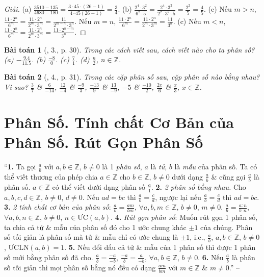 \documentclass{article}
\newtheorem{baitoan}{Bài toán}
\begin{document}
\begin{proof}[Giải]
	(a) $\frac{3510 - 135}{4680 - 180} = \frac{3\cdot45\cdot(26 - 1)}{4\cdot45(26 - 1)} = \frac{3}{4}$. (b) $\frac{2^4\cdot3^2}{6^2\cdot5} = \frac{2^4\cdot3^2}{2^2\cdot3^2\cdot5} = \frac{2^2}{5} = \frac{4}{5}$. (c) Nếu $m > n$, $\frac{11\cdot2^n}{6^m} = \frac{11\cdot2^n}{2^m\cdot3^m} = \frac{11}{2^{m-n}\cdot3^n}$. Nếu $m = n$, $\frac{11\cdot2^n}{6^m} = \frac{11\cdot2^n}{2^m\cdot3^m} = \frac{11}{3^n}$. (c) Nếu $m < n$, $\frac{11\cdot2^n}{6^m} = \frac{11\cdot2^n}{2^m\cdot3^m} = \frac{11\cdot2^{n-m}}{3^n}$.
\end{proof}

\begin{baitoan}[\cite{SBT_Toan_6_Canh_Dieu_tap_2}, 3., p. 30]
	Trong các cách viết sau, cách viết nào cho ta phân số? (a) $-\frac{9.4}{11.5}$. (b) $\frac{-8}{0}$. (c) $\frac{7}{1}$. (d) $\frac{n}{2}$, $n\in\mathbb{Z}$.
\end{baitoan}

\begin{baitoan}[\cite{SBT_Toan_6_Canh_Dieu_tap_2}, 4., p. 31]
	Trong các cặp phân số sau, cặp phân số nào bằng nhau? Vì sao? $\frac{3}{7}$ \& $\frac{6}{-14}$, $\frac{12}{-4}$ \& $\frac{-9}{3}$, $\frac{-13}{9}$ \& $\frac{13}{-9}$, $-5$ \& $\frac{-10}{2}$, $\frac{2x}{6}$ \& $\frac{x}{3}$, $x\in\mathbb{Z}$.
\end{baitoan}


\section{Phân Số. Tính chất Cơ Bản của Phân Số. Rút Gọn Phân Số}
``\textbf{1.} Ta gọi $\frac{a}{b}$ với $a,b\in\mathbb{Z}$, $b\ne0$ là 1 \textit{phân số}, $a$ là \textit{tử}, $b$ là \textit{mẫu} của phân số. Ta có thể viết thương của phép chia $a\in\mathbb{Z}$ cho $b\in\mathbb{Z}$, $b\ne 0$ dưới dạng $\frac{a}{b}$ \& cũng gọi $\frac{a}{b}$ là phân số. $a\in\mathbb{Z}$ có thể viết dưới dạng phân số $\frac{a}{1}$. \textbf{2.} \textit{2 phân số bằng nhau.} Cho $a,b,c,d\in\mathbb{Z}$, $b\ne0$, $d\ne 0$. Nếu $ad = bc$ thì $\frac{a}{b} = \frac{c}{d}$, ngược lại nếu $\frac{a}{b} = \frac{c}{d}$ thì $ad = bc$. \textbf{3.} \textit{2 tính chất cơ bản của phân số}: $\frac{a}{b} = \frac{am}{bm}$, $\forall a,b,m\in\mathbb{Z}$, $b\ne0$, $m\ne0$. $\frac{a}{b} = \frac{a:n}{b:n}$, $\forall a,b,n\in\mathbb{Z}$, $b\ne0$, $n\in\mbox{ƯC}(a,b)$. \textbf{4.} \textit{Rút gọn phân số}: Muốn rút gọn 1 phân số, ta chia cả tử \& mẫu của phân số đó cho 1 ước chung khác $\pm1$ của chúng. Phân số tối giản là phân số mà tử \& mẫu chỉ có ước chung là $\pm1$, i.e., $\frac{a}{b}$, $a,b\in\mathbb{Z}$, $b\ne0$, $\mbox{ƯCLN}(a,b) = 1$. \textbf{5.} Nếu đổi dấu cả tử \& mẫu của 1 phân số thì được 1 phân số mới bằng phân số đã cho. $\frac{a}{b} = \frac{-a}{-b}$, $\frac{-a}{b} = \frac{a}{-b}$, $\forall a,b\in\mathbb{Z}$, $b\ne0$. \textbf{6.} Nếu $\frac{a}{b}$ là phân số tối giản thì mọi phân số bằng nó đều có dạng $\frac{am}{bm}$ với $m\in\mathbb{Z}$ \& $m\ne0$.'' -- \cite[Chap. 3, \S1, p. 45]{Tuyen_Toan_6}
\end{document}
